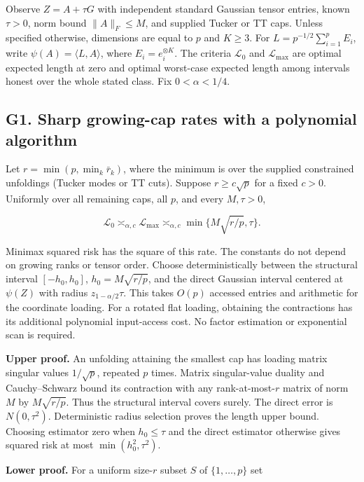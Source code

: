 Observe \(Z=A+\tau G\) with independent standard Gaussian tensor
entries, known \(\tau>0\), norm bound \(\|A\|_F\le M\), and supplied
Tucker or TT caps. Unless specified otherwise, dimensions are equal to
\(p\) and \(K\ge3\). For \(L=p^{-1/2}\sum_{i=1}^p E_i\), write
\(\psi(A)=\langle L,A\rangle\), where \(E_i=e_i^{\otimes K}\). The
criteria \(\mathcal L_0\) and \(\mathcal L_{\max}\) are optimal expected
length at zero and optimal worst-case expected length among intervals
honest over the whole stated class. Fix \(0<\alpha<1/4\).

\subsection{G1. Sharp growing-cap rates with a polynomial
algorithm}\label{g1.-sharp-growing-cap-rates-with-a-polynomial-algorithm}\label{sup:G1}

Let \(r=\min(p,\min_k\bar r_k)\), where the minimum is over the supplied
constrained unfoldings (Tucker modes or TT cuts). Suppose
\(r\ge c\sqrt p\) for a fixed \(c>0\). Uniformly over all remaining
caps, all \(p\), and every \(M,\tau>0\),

\[\mathcal L_0\asymp_{\alpha,c}\mathcal L_{\max}
\asymp_{\alpha,c}\min\{M\sqrt{r/p},\tau\}.\]

Minimax squared risk has the square of this rate. The constants do not
depend on growing ranks or tensor order. Choose deterministically
between the structural interval \([-h_0,h_0]\), \(h_0=M\sqrt{r/p}\), and
the direct Gaussian interval centered at \(\psi(Z)\) with radius
\(z_{1-\alpha/2}\tau\). This takes \(O(p)\) accessed entries and
arithmetic for the coordinate loading. For a rotated flat loading,
obtaining the contractions has its additional polynomial input-access
cost. No factor estimation or exponential scan is required.

\textbf{Upper proof.} An unfolding attaining the smallest cap has
loading matrix singular values \(1/\sqrt p\), repeated \(p\) times.
Matrix singular-value duality and Cauchy--Schwarz bound its contraction
with any rank-at-most-\(r\) matrix of norm \(M\) by \(M\sqrt{r/p}\).
Thus the structural interval covers surely. The direct error is
\(N(0,\tau^2)\). Deterministic radius selection proves the length upper
bound. Choosing estimator zero when \(h_0\le\tau\) and the direct
estimator otherwise gives squared risk at most \(\min(h_0^2,\tau^2)\).

\textbf{Lower proof.} For a uniform size-\(r\) subset \(S\) of
\(\{1,\ldots,p\}\) set


